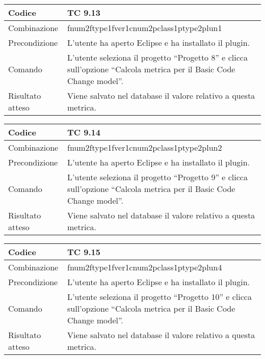 \clearpage

\begin{table}[ht]
\begin{tabular}{|p{3cm}|p{9cm}|}
\hline
\cellcolor{lightgray}Codice				& TC 9.13								\\
\hline
\cellcolor{lightgray}Combinazione		& fnum2ftype1fver1cnum2pclass1ptype2plun1									\\
\hline
\cellcolor{lightgray}Precondizione		& L'utente ha aperto Eclipse e ha installato il plugin.		\\
\hline
\cellcolor{lightgray}Comando			& L'utente seleziona il progetto ``Progetto 8''  e clicca sull'opzione ``Calcola metrica per il Basic Code Change model''.	\\
\hline
\cellcolor{lightgray}Risultato atteso	& Viene salvato nel database il valore relativo a questa metrica.\\
\hline
\end{tabular}
\end{table}

\begin{table}[ht]
\begin{tabular}{|p{3cm}|p{9cm}|}
\hline
\cellcolor{lightgray}Codice				& TC 9.14								\\
\hline
\cellcolor{lightgray}Combinazione		& fnum2ftype1fver1cnum2pclass1ptype2plun2									\\
\hline
\cellcolor{lightgray}Precondizione		& L'utente ha aperto Eclipse e ha installato il plugin.		\\
\hline
\cellcolor{lightgray}Comando			& L'utente seleziona il progetto ``Progetto 9''  e clicca sull'opzione ``Calcola metrica per il Basic Code Change model''.	\\
\hline
\cellcolor{lightgray}Risultato atteso	& Viene salvato nel database il valore relativo a questa metrica.\\
\hline
\end{tabular}
\end{table}

\begin{table}[ht]
\begin{tabular}{|p{3cm}|p{9cm}|}
\hline
\cellcolor{lightgray}Codice				& TC 9.15								\\
\hline
\cellcolor{lightgray}Combinazione		& fnum2ftype1fver1cnum2pclass1ptype2plun4									\\
\hline
\cellcolor{lightgray}Precondizione		& L'utente ha aperto Eclipse e ha installato il plugin.		\\
\hline
\cellcolor{lightgray}Comando			& L'utente seleziona il progetto ``Progetto 10''  e clicca sull'opzione ``Calcola metrica per il Basic Code Change model''.	\\
\hline
\cellcolor{lightgray}Risultato atteso	& Viene salvato nel database il valore relativo a questa metrica.\\
\hline
\end{tabular}
\end{table}

